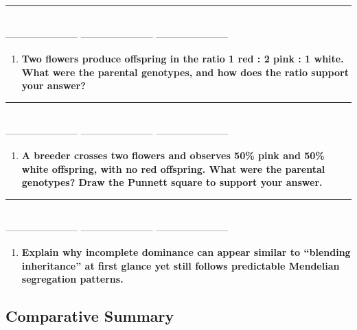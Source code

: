 \documentclass[
  letterpaper,
  DIV=11,
  numbers=noendperiod]{scrreprt}
\providecommand{\tightlist}{%
  \setlength{\itemsep}{0pt}\setlength{\parskip}{0pt}}
\begin{document}
\begin{center}\rule{0.5\linewidth}{0.5pt}\end{center}

\textbf{~~}\\
----------------------- ----------------------- -----------------------

\begin{enumerate}
\def\labelenumi{\arabic{enumi}.}
\setcounter{enumi}{4}
\tightlist
\item
  \textbf{Two flowers produce offspring in the ratio 1 red : 2 pink : 1
  white. What were the parental genotypes, and how does the ratio
  support your answer?}
\end{enumerate}

\begin{center}\rule{0.5\linewidth}{0.5pt}\end{center}

\textbf{~~}\\
----------------------- ----------------------- -----------------------

\begin{enumerate}
\def\labelenumi{\arabic{enumi}.}
\setcounter{enumi}{5}
\tightlist
\item
  \textbf{A breeder crosses two flowers and observes 50\% pink and 50\%
  white offspring, with no red offspring. What were the parental
  genotypes? Draw the Punnett square to support your answer.}
\end{enumerate}

\begin{center}\rule{0.5\linewidth}{0.5pt}\end{center}

\textbf{~~}\\
----------------------- ----------------------- -----------------------

\begin{enumerate}
\def\labelenumi{\arabic{enumi}.}
\setcounter{enumi}{6}
\tightlist
\item
  \textbf{Explain why incomplete dominance can appear similar to
  ``blending inheritance'' at first glance yet still follows predictable
  Mendelian segregation patterns.}
\end{enumerate}

\subsection{\texorpdfstring{\textbf{Comparative
Summary}}{Comparative Summary}}\label{comparative-summary}
\end{document}
